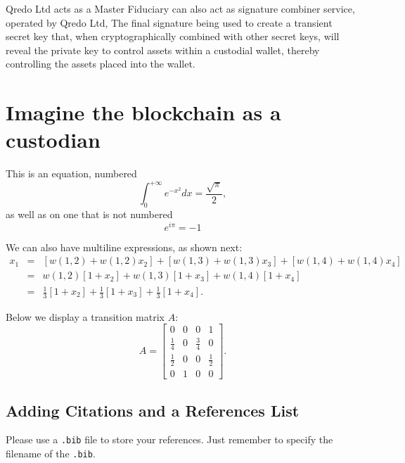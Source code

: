 \documentclass[num-refs]{wiley-networks}
\begin{document}
Qredo Ltd acts as a Master Fiduciary can also act as signature combiner service, operated by Qredo Ltd, The final signature being used to create a transient secret key that, when cryptographically combined with other secret keys, will reveal the private key to control assets within a custodial wallet, thereby controlling the assets placed into the wallet. 





\section{Imagine the blockchain as a custodian}

This is an equation, numbered
\begin{equation}
\int_0^{+\infty}e^{-x^2}dx=\frac{\sqrt{\pi}}{2},
\end{equation}
as well as on one that is not numbered
\begin{equation*}
e^{i\pi}=-1
\end{equation*}

We can also have multiline expressions, as shown next:
\begin{eqnarray*}
x_1&= & [w(1,2) + w(1,2) x_2] + [w(1,3) + w(1,3) x_3] + [w(1,4) + w(1,4) x_4] \\
      &= & w(1,2) [1+ x_2] + w(1,3)[1 + x_3] + w(1,4)[1  +  x_4] \\
      &= & \tfrac{1}{3} [1+ x_2] + \tfrac{1}{3}[1 + x_3] + \tfrac{1}{3}[1  +  x_4] .
\end{eqnarray*}

Below we display a transition matrix $A$:
\[
A = \begin{bmatrix}
0 & 0 & 0 & 1\\
\frac{1}{4} & 0 & \frac{3}{4} & 0\\[.06cm]
\frac{1}{2} & 0 & 0 & \frac{1}{2}\\[.05cm]
0 & 1 & 0 & 0
       \end{bmatrix}.
\]




\subsection{Adding Citations and a References List}

Please use a \verb|.bib| file to store your references. Just remember to specify the filename of the \verb|.bib|.
\end{document}
